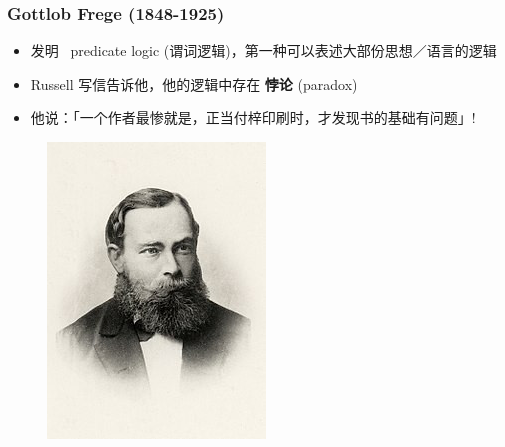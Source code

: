 \documentclass[15pt]{beamer}
\begin{document}
\begin{frame}
\frametitle{Gottlob Frege (1848-1925)}
\begin{minipage}[t]{0.55\linewidth}
	\begin{itemize}
		\item 发明 {\color{red}\ predicate logic} (谓词逻辑)，第一种可以表述大部份思想／语言的逻辑
		\item Russell 写信告诉他，他的逻辑中存在 \textbf{悖论} (paradox)
		\item 他说：「一个作者最惨就是，正当付梓印刷时，才发现书的基础有问题」!
	\end{itemize}
\end{minipage}
\hfill
\begin{minipage}[t]{0.4\linewidth}
	\begin{figure}[H]
		\includegraphics[scale=0.55]{Frege.jpg}
	\end{figure}
\end{minipage}
\end{frame}
\end{document}
